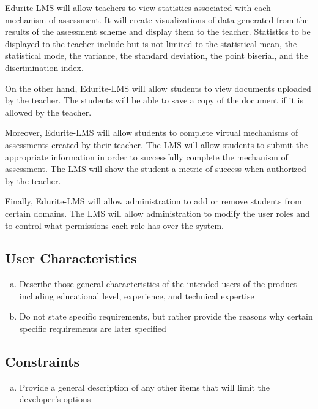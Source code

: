 \documentclass[]{article}
\begin{document}
Edurite-LMS will allow teachers to view statistics associated with each 
mechanism of assessment. It will create visualizations of data generated from 
the results of the assessment scheme and display them to the teacher. Statistics 
to be displayed to the teacher include but is not limited to the statistical 
mean, the statistical mode, the variance, the standard deviation, the point 
biserial, and the discrimination index.

On the other hand, Edurite-LMS will allow students to view documents uploaded by 
the teacher. The students will be able to save a copy of the document if it is 
allowed by the teacher. 

Moreover, Edurite-LMS will allow students to complete virtual mechanisms of 
assessments created by their teacher. The LMS will allow students to submit the 
appropriate information in order to successfully complete the mechanism of 
assessment. The LMS will show the student a metric of success when authorized by 
the teacher.

Finally, Edurite-LMS will allow administration to add or remove students from 
certain domains. The LMS will allow administration to modify the user roles and 
to control what permissions each role has over the system.

\subsection{User Characteristics}
\label{sub:user_characteristics}
\begin{enumerate}[a)]
	\item Describe those general characteristics of the intended users of the 
product including educational level, experience, and technical expertise
	\item Do not state specific requirements, but rather provide the reasons why 
certain specific requirements are later specified
\end{enumerate}

\subsection{Constraints}
\label{sub:constraints}
\begin{enumerate}[a)]
	\item Provide a general description of any other items that will limit the 
developer's options
\end{enumerate}
\end{document}

